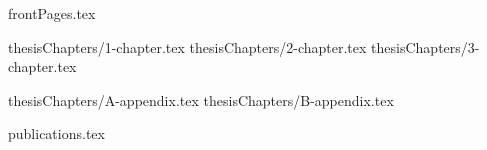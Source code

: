 \documentclass[a4paper,12pt,oneside,openany]{book}
\begin{document}
 {frontPages.tex}


 {thesisChapters/1-chapter.tex}
 {thesisChapters/2-chapter.tex}
 {thesisChapters/3-chapter.tex}


\newpage\appendix

 {thesisChapters/A-appendix.tex}
 {thesisChapters/B-appendix.tex}


\newpage
{}
\singlespacing
\printbibliography[title={\bibName}]

\ifnum{}
\newpage
{}
 {publications.tex}
\fi
\end{document}
